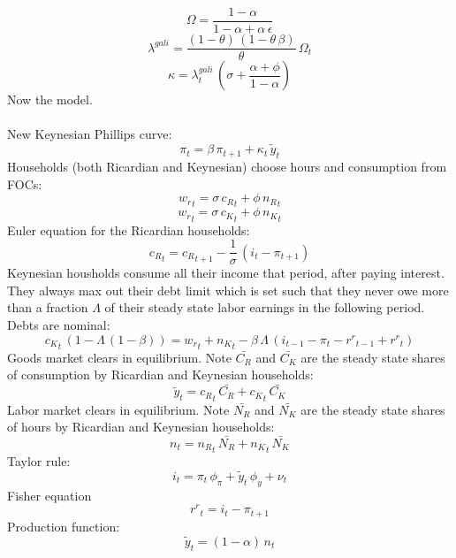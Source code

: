 \documentclass[titlepage]{\econtex}\newcommand{\texname}{ConsumptionHeterogeneity}
\begin{document}
\begin{dmath*}
	\Omega = \frac{1-{\alpha}}{1-{\alpha}+{\alpha}\, {\epsilon}}
\end{dmath*}
\begin{dmath*}
	\lambda^{gali} = \frac{\left(1-{\theta}\right)\, \left(1-{\theta}\, {\beta}\right)}{{\theta}}\, \Omega_{t}
\end{dmath*}
\begin{dmath*}
	\kappa = \lambda^{gali}_{t}\, \left({\sigma}+\frac{{\alpha}+{\phi}}{1-{\alpha}}\right)
\end{dmath*}
Now the model.\\
\\
New Keynesian Phillips curve:
\begin{dmath}
	{\pi}_{t}={\beta}\, {\pi}_{t+1}+\kappa_{t}\, {\tilde y}_{t}
\end{dmath}
Households (both Ricardian and Keynesian) choose hours and consumption from FOCs:
\begin{dmath}
	{w_r}_{t}={\sigma}\, {c_R}_{t}+{\phi}\, {n_R}_{t}
\end{dmath}
\begin{dmath}
	{w_r}_{t}={\sigma}\, {c_K}_{t}+{\phi}\, {n_K}_{t}
\end{dmath}
Euler equation for the Ricardian households:
\begin{dmath}
	{c_R}_{t}={c_R}_{t+1}-\frac{1}{{\sigma}}\, \left({i}_{t}-{\pi}_{t+1}\right)
\end{dmath}
Keynesian housholds consume all their income that period, after paying interest. They always max out their debt limit which is set such that they never owe more than a fraction $\Lambda$ of their steady state labor earnings in the following period. Debts are nominal:
\begin{dmath}
	{c_K}_{t}\, \left(1-{\Lambda}\, \left(1-{\beta}\right)\right)={w_r}_{t}+{n_K}_{t}-{\beta}\, {\Lambda}\, \left({i}_{t-1}-{\pi}_{t}-{r^r}_{t-1}+{r^r}_{t}\right)
\end{dmath}
Goods market clears in equilibrium. Note $\bar{C_R}$ and $\bar{C_K}$ are the steady state shares of consumption by Ricardian and Keynesian households:
\begin{dmath}
	{\tilde y}_{t}={c_R}_{t}\, \bar{C_R}+{c_K}_{t}\, \bar{C_K}
\end{dmath}
Labor market clears in equilibrium. Note $\bar{N_R}$ and $\bar{N_K}$ are the steady state shares of hours by Ricardian and Keynesian households:
\begin{dmath}
	{n}_{t}={n_R}_{t}\, \bar{N_R}+{n_K}_{t}\, \bar{N_K}
\end{dmath}
Taylor rule:
\begin{dmath}
	{i}_{t}={\pi}_{t}\, {\phi_{\pi}}+{\tilde y}_{t}\, {\phi_{y}}+{\nu}_{t}
\end{dmath}
Fisher equation
\begin{dmath}
	{r^r}_{t}={i}_{t}-{\pi}_{t+1}
\end{dmath}
Production function:
\begin{dmath}
	{\tilde y}_{t}=\left(1-{\alpha}\right)\, {n}_{t}
\end{dmath}
\end{document}
